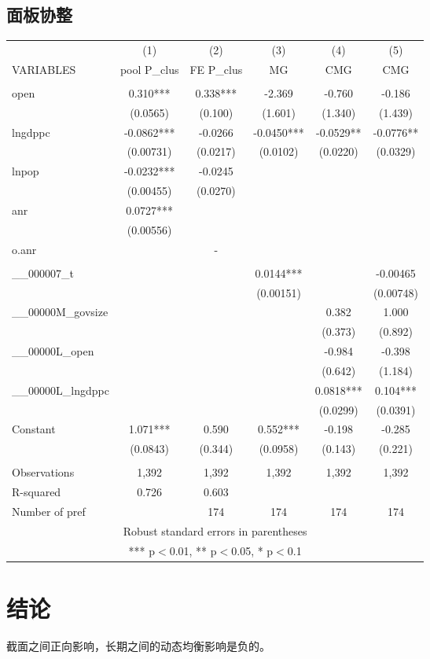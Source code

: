 \documentclass[10pt]{article}
\begin{document}
\subsection{面板协整}
    \begin{center}
        \begin{tabular}{lccccc} \hline
         & (1) & (2) & (3) & (4) & (5) \\
        VARIABLES & pool P\_clus & FE P\_clus & MG & CMG & CMG \\ \hline
         &  &  &  &  &  \\
        open & 0.310*** & 0.338*** & -2.369 & -0.760 & -0.186 \\
         & (0.0565) & (0.100) & (1.601) & (1.340) & (1.439) \\
        lngdppc & -0.0862*** & -0.0266 & -0.0450*** & -0.0529** & -0.0776** \\
         & (0.00731) & (0.0217) & (0.0102) & (0.0220) & (0.0329) \\
        lnpop & -0.0232*** & -0.0245 &  &  &  \\
         & (0.00455) & (0.0270) &  &  &  \\
        anr & 0.0727*** &  &  &  &  \\
         & (0.00556) &  &  &  &  \\
        o.anr &  & - &  &  &  \\
         &  &  &  &  &  \\
        \_\_000007\_t &  &  & 0.0144*** &  & -0.00465 \\
         &  &  & (0.00151) &  & (0.00748) \\
        \_\_00000M\_govsize &  &  &  & 0.382 & 1.000 \\
         &  &  &  & (0.373) & (0.892) \\
        \_\_00000L\_open &  &  &  & -0.984 & -0.398 \\
         &  &  &  & (0.642) & (1.184) \\
        \_\_00000L\_lngdppc &  &  &  & 0.0818*** & 0.104*** \\
         &  &  &  & (0.0299) & (0.0391) \\
        Constant & 1.071*** & 0.590 & 0.552*** & -0.198 & -0.285 \\
         & (0.0843) & (0.344) & (0.0958) & (0.143) & (0.221) \\
         &  &  &  &  &  \\
        Observations & 1,392 & 1,392 & 1,392 & 1,392 & 1,392 \\
        R-squared & 0.726 & 0.603 &  &  &  \\
         Number of pref &  & 174 & 174 & 174 & 174 \\ \hline
        \multicolumn{6}{c}{ Robust standard errors in parentheses} \\
        \multicolumn{6}{c}{ *** p$<$0.01, ** p$<$0.05, * p$<$0.1} \\
    \end{tabular}
    \end{center}


\section{结论}
截面之间正向影响，长期之间的动态均衡影响是负的。

\renewcommand\refname{参考文献}
%

\end{document}
